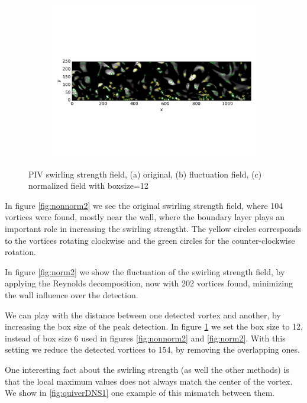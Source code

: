 \documentclass[12pt, a4paper, openany]{memoir}
\begin{document}
\begin{figure}[h!]
\begin{subfigure}[b]{\textwidth}
	\includegraphics[trim=0 130 0 150 , clip, width=\textwidth]{figure/PIVbox12normalized.pdf}
	\caption{}
	\label{fig:boxnorm2}
	\end{subfigure}
	\caption{PIV swirling strength field, (a) original, (b) fluctuation field, (c) normalized field with boxsize=12 }
	\label{fig:PIVcomparison}
\end{figure}

In figure \ref{fig:nonnorm2} we see the original swirling strength field, where 104 vortices were found, mostly near the wall, where the boundary layer plays an important role in increasing the swirling strengtht. The yellow circles corresponds to the vortices rotating clockwise and the green circles for the counter-clockwise rotation. 

In figure \ref{fig:norm2} we show the fluctuation of the swirling strength field, by applying the Reynolds decomposition, now with 202 vortices found, minimizing the wall influence over the detection.

We can play with the distance between one detected vortex and another, by increasing the box size of the peak detection. In figure \ref{fig:boxnorm2} we set the box size to 12, instead of box size 6 used in figures \ref{fig:nonnorm2} and \ref{fig:norm2}. With this setting we reduce the detected vortices to 154, by removing the overlapping ones.

One interesting fact about the swirling strength (as well the other methods) is that the local maximum values does not always match the center of the vortex. We show in \ref{fig:quiverDNS1} one example of this mismatch between them.
\end{document}
